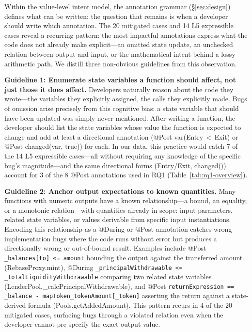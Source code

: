 \documentclass[pdflatex,sn-basic]{sn-jnl}%
\theoremstyle{thmstyleone}%
\theoremstyle{thmstyletwo}%
\theoremstyle{thmstylethree}%
\begin{document}
Within the value-level intent model, the annotation grammar (§\ref{sec:design}) defines what can be written; the question that remains is when a developer should write which annotation.
The 20 mitigated cases and 14 L5 expressible cases reveal a recurring pattern: the most impactful annotations express what the code does not already make explicit---an omitted state update, an unchecked relation between output and input, or the mathematical intent behind a lossy arithmetic path.
We distill three non-obvious guidelines from this observation.

\smallskip
\noindent\textbf{Guideline 1: Enumerate state variables a function should affect, not just those it does affect.}
Developers naturally reason about the code they wrote---the variables they explicitly assigned, the calls they explicitly made.
Bugs of omission arise precisely from this cognitive bias: a state variable that should have been updated was simply never mentioned.
After writing a function, the developer should list the state variables whose value the function is expected to change and add at least a directional annotation (@Post var(Entry\,$<$\,Exit) or @Post changed(var, true)) for each.
In our data, this practice would catch 7 of the 14 L5 expressible cases---all without requiring any knowledge of the specific bug's magnitude---and the same directional forms (Entry/Exit, changed()) account for 3 of the 8 @Post annotations used in RQ1 (Table~\ref{tab:rq1-overview}).

\smallskip
\noindent\textbf{Guideline 2: Anchor output expectations to known quantities.}
Many functions with numeric outputs have a known relationship---a bound, an equality, or a monotonic relation---with quantities already in scope: input parameters, related state variables, or values derivable from specific input instantiations.
Encoding this relationship as a @During or @Post annotation catches wrong-implementation bugs where the code runs without error but produces a directionally wrong or out-of-bound result.
Examples include @Post \texttt{\_balances[to] <= amount} bounding the output against the transferred amount (RebaseProxy.mint), @During \texttt{\_principalWithdrawable <= \_totalLiquidityWithdrawable} comparing two related state variables (LenderPool.\_calcPrincipalWithdrawable), and @Post \texttt{returnExpression == \_balance - mapToken\_tokenAmount[\_token]} asserting the return against a state-derived formula (Pools.getAddedAmount).
This pattern recurs in 4 of the 20 mitigated cases, surfacing bugs through a violated relation even when the developer cannot pre-specify the exact output value.
\end{document}
